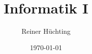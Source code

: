 \title{Informatik I}
\date{\today}
\author{Reiner Hüchting}

\begin{frame}
    \titlepage
\end{frame}

